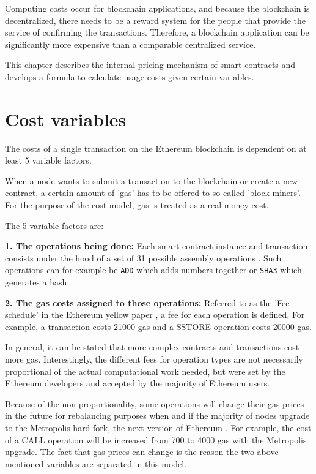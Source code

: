 Computing costs occur for blockchain applications, and because the blockchain is decentralized, there needs to be a reward system for the people that provide the service of confirming the transactions.
Therefore, a blockchain application can be significantly more expensive than a comparable centralized service.

This chapter describes the internal pricing mechanism of smart contracts and develops a formula to calculate usage costs given certain variables.

\section{Cost variables}

The costs of a single transaction on the Ethereum blockchain is dependent on at least 5 variable factors. 

When a node wants to submit a transaction to the blockchain or create a new contract, a certain amount of {'}gas{'} has to be offered to so called {'}block miners{'}. For the purpose of the cost model, gas is treated as a real money cost.

The 5 variable factors are:

\textbf{1. The operations being done:} Each smart contract instance and transaction consists under the hood of a set of 31 possible assembly operations \cite{YellowPaper}. Such operations can for example be \texttt{ADD} which adds numbers together or \texttt{SHA3} which generates a hash.

\par
\textbf{2. The gas costs assigned to those operations:} Referred to as the 'Fee schedule' in the Ethereum yellow paper \cite{YellowPaper}, a fee for each operation is defined. For example, a transaction costs 21000 gas and a SSTORE operation costs 20000 gas.

In general, it can be stated that more complex contracts and transactions cost more gas. Interestingly, the different fees for operation types are not necessarily proportional of the actual computational work needed, but were set by the Ethereum developers and accepted by the majority of Ethereum users.

Because of the non-proportionality, some operations will change their gas prices in the future for rebalancing purposes when and if the majority of nodes upgrade to the Metropolis hard fork, the next version of Ethereum \cite{EIP150}. For example, the cost of a CALL operation will be increased from 700 to 4000 gas with the Metropolis upgrade.
The fact that gas prices can change is the reason the two above mentioned variables are separated in this model.


